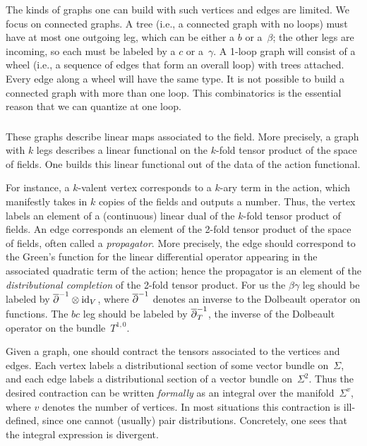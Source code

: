 The kinds of graphs one can build with such vertices and edges are limited.
We focus on connected graphs.
A tree (i.e., a connected graph with no loops) must have at most one outgoing leg,
which can be either a $b$ or a~$\beta$;
the other legs are incoming, so each must be labeled by a $c$ or a~$\gamma$.
A 1-loop graph will consist of a wheel (i.e., a sequence of edges that form an overall loop)
with trees attached.
Every edge along a wheel will have the same type.
It is not possible to build a connected graph with more than one loop.
This combinatorics is the essential reason that we can quantize at one loop.

\subsubsection{}

These graphs describe linear maps associated to the field.
More precisely, a graph with $k$ legs describes a linear functional on the $k$-fold tensor product of the space of fields.
One builds this linear functional out of the data of the action functional.

For instance, a $k$-valent vertex corresponds to a $k$-ary term in the action,
which manifestly takes in $k$ copies of the fields and outputs a number.
Thus, the vertex labels an element of a (continuous) linear dual of the $k$-fold tensor product of fields.
An edge corresponds an element of the 2-fold tensor product of the space of fields,
often called a {\em propagator}.
More precisely, the edge should correspond to
the Green's function for the linear differential operator 
appearing in the associated quadratic term of the action;
hence the propagator is an element of the {\em distributional completion} of the 2-fold tensor product.
For us the $\beta\gamma$ leg should be labeled by $\overline{\partial}^{-1} \otimes {\rm id}_V$,
where $\overline{\partial}^{-1}$ denotes an inverse to the Dolbeault operator on functions.
The $bc$ leg should be labeled by $\overline{\partial}^{-1}_T$, 
the inverse of the Dolbeault operator on the bundle~$T^{1,0}$.

Given a graph, one should contract the tensors associated to the vertices and edges.
Each vertex labels a distributional section of some vector bundle on~$\Sigma$,
and each edge labels a distributional section of a vector bundle on~$\Sigma^2$.
Thus the desired contraction can be written {\em formally} as an integral over the manifold~$\Sigma^{v}$,
where $v$ denotes the number of vertices.
In most situations this contraction is ill-defined, 
since one cannot (usually) pair distributions.
Concretely, one sees that the integral expression is divergent.

